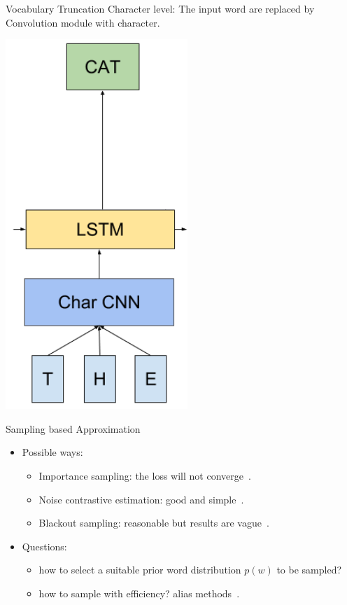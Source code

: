 \documentclass[english]{beamer} %
\begin{document}
\begin{frame}[<+->]{Vocabulary Truncation}
Character level:  The input word are replaced by Convolution module with character.

  \begin{center}
    \includegraphics[scale=0.33]{lm1b_arch_a.png}
  \end{center}
\end{frame}

\begin{frame}[<+->]{Sampling based Approximation}
\begin{itemize}
\item {Possible ways:}
\begin{itemize}
  \item Importance sampling: the loss will not converge~\cite{DBLP:journals/tnn/BengioS08}.
  \item Noise contrastive estimation: good and simple~\cite{DBLP:conf/icml/MnihT12}.
  \item Blackout sampling: reasonable but results are vague~\cite{DBLP:journals/iclr/JiVSAD15}.
\end{itemize}
\item {Questions:}
\begin{itemize}
  \item how to select a suitable prior word distribution $p(w)$ to be sampled?
  \item how to sample with efficiency? alias methods~\cite{10.2307/2683739,DBLP:conf/emnlp/VaswaniZFC13}.
\end{itemize}
\end{itemize}
\end{frame}
\end{document}
